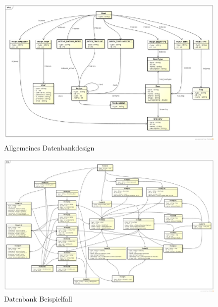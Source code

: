 \documentclass[10pt,a4paper]{scrartcl}
\begin{document}
\begin{figure}[H]
	\includegraphics[height=0.9\textwidth,angle=90]{Database_Design_Graph.png}
	\caption{Allgemeines Datenbankdesign}
	\label{fig:database_design}
\end{figure}

\begin{figure}[H]
	\includegraphics[height=\textwidth,angle=90]{Database_Example.png}
	\caption{Datenbank Beispielfall}
	\label{fig:database_design_example}
\end{figure}
\end{document}
